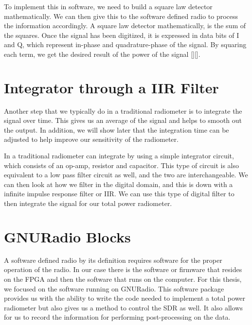 To implement this in software, we need to build a square law detector mathematically.  We can then give this to the software defined radio to process the information accordingly.  A square law detector mathematically, is the sum of the squares.  Once the signal has been digitized, it is expressed in data bits of I and Q, which represent in-phase and quadrature-phase of the signal.  By squaring each term, we get the desired result of the power of the signal [\cite{Sarijari}][\cite{Rashid}].

\section{Integrator through a IIR Filter}

Another step that we typically do in a traditional radiometer is to integrate the signal over time.  This gives us an average of the signal and helps to smooth out the output.  In addition, we will show later that the integration time can be adjusted to help improve our sensitivity of the radiometer.

In a traditional radiometer can integrate by using a simple integrator circuit, which consists of an op-amp, resistor and capacitor.  This type of circuit is also equivalent to a low pass filter circuit as well, and the two are interchangeable.  We can then look at how we filter in the digital domain, and this is down with a infinite impulse response filter or IIR.  We can use this type of digital filter to then integrate the signal for our total power radiometer. 

\section{GNURadio Blocks}
A software defined radio by its definition requires software for the proper operation of the radio.  In our case there is the software or firmware that resides on the FPGA and then the software that runs on the computer.  For this thesis, we focused on the software running on GNURadio.  This software package provides us with the ability to write the code needed to implement a total power radiometer but also gives us a method to control the SDR as well.  It also allows for us to record the information for performing post-processing on the data.

